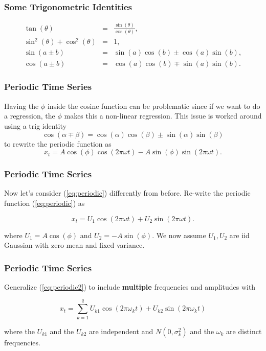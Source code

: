 \documentclass[%
xcolor=pdftex]{beamer}
\begin{document}
\begin{frame}
\frametitle{Some Trigonometric Identities}

\begin{eqnarray*}
\tan(\theta) &=& \frac{\sin(\theta)}{\cos(\theta)}, \\
\sin^2(\theta) + \cos^2(\theta) &=& 1, \\
\sin(a \pm b) &=& \sin(a) \cos(b) \pm \cos(a) \sin(b), \\
\cos(a \pm b) &=& \cos(a) \cos(b) \mp \sin(a) \sin(b).
\end{eqnarray*}

\end{frame}

\begin{frame}
\frametitle{Periodic Time Series}

Having the $\phi$ inside the cosine function can be problematic since if we want to do a regression,
the $\phi$ makes this a non-linear regression. This issue is worked around using a trig identity
$$
\cos(\alpha \mp \beta)=\cos(\alpha) \cos(\beta) \pm \sin(\alpha) \sin(\beta)
$$
to rewrite the periodic function as
\begin{equation} \label{eq:periodic}
x_t=A \cos(\phi) \cos(2 \pi \omega t)-A \sin(\phi) \sin(2 \pi \omega t).
\end{equation}

\end{frame}

\begin{frame}
\frametitle{Periodic Time Series}

Now let's consider (\ref{eq:periodic}) differently from before. Re-write the periodic function (\ref{eq:periodic}) as

\begin{equation} \label{eq:periodic2}
x_t=U_1 \cos(2 \pi \omega t)+U_2 \sin(2 \pi \omega t).
\end{equation}

where $U_1 = A \cos(\phi)$ and $U_2 = -A \sin(\phi)$. We now assume $U_1, U_2$ are iid Gaussian with zero mean and fixed variance.

\end{frame}



\begin{frame}
\frametitle{Periodic Time Series}

Generalize (\ref{eq:periodic2}) to include \textbf{multiple} frequencies and amplitudes with

\begin{equation} \label{eq:gen}
x_t = \sum_{k=1}^{q} U_{k1} \cos(2 \pi \omega_k t) + U_{k2} \sin(2 \pi \omega_k t)
\end{equation}

where the $U_{k1}$ and the $U_{k2}$ are independent and $N(0 , \sigma_k^2)$ and the $\omega_k$ are distinct frequencies.

\end{frame}
\end{document}
